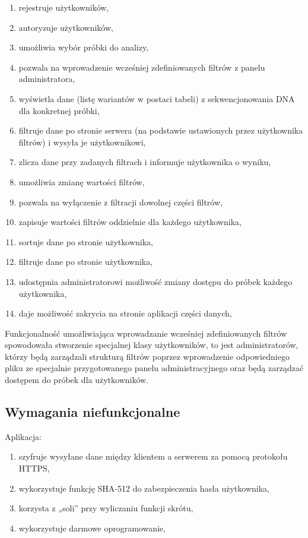 \documentclass[a4paper,12pt,twoside]{article}
\begin{document}
\begin{enumerate}[1)]
\item rejestruje użytkowników,
\item autoryzuje użytkowników,
\item umożliwia wybór próbki do analizy,
\item pozwala na wprowadzenie wcześniej zdefiniowanych filtrów z panelu administratora,
\item wyświetla dane (listę wariantów w postaci tabeli) z sekwencjonowania DNA dla konkretnej próbki,
\item filtruje dane po stronie serwera (na podstawie ustawionych przez użytkownika filtrów) i wysyła je użytkownikowi,
\item zlicza dane przy zadanych filtrach i informuje użytkownika o wyniku,
\item umożliwia zmianę wartości filtrów,
\item pozwala na wyłączenie z filtracji dowolnej części filtrów,
\item zapisuje wartości filtrów oddzielnie dla każdego użytkownika,
\item sortuje dane po stronie użytkownika,
\item filtruje dane po stronie użytkownika,
\item udostępnia administratorowi możliwość zmiany dostępu do próbek
każdego użytkownika,
\item daje możliwość zakrycia na stronie aplikacji części danych,
\end{enumerate}

Funkcjonalność umożliwiająca wprowadzanie wcześniej zdefiniowanych filtrów spowodowała stworzenie
specjalnej klasy użytkowników, to jest administratorów, którzy będą zarządzali strukturą filtrów poprzez wprowadzenie odpowiedniego pliku ze specjalnie przygotowanego panelu administracyjnego
oraz będą zarządzać dostępem do próbek dla użytkowników.

\subsection{Wymagania niefunkcjonalne}
Aplikacja:
\begin{enumerate}[1)]
\item szyfruje wysyłane dane między klientem a serwerem za pomocą protokołu HTTPS,
\item wykorzystuje funkcję SHA-512 \cite{sha} do zabezpieczenia hasła użytkownika,
\item korzysta z „soli” przy wyliczaniu funkcji skrótu,
\item wykorzystuje darmowe oprogramowanie,
\end{enumerate}
\end{document}
